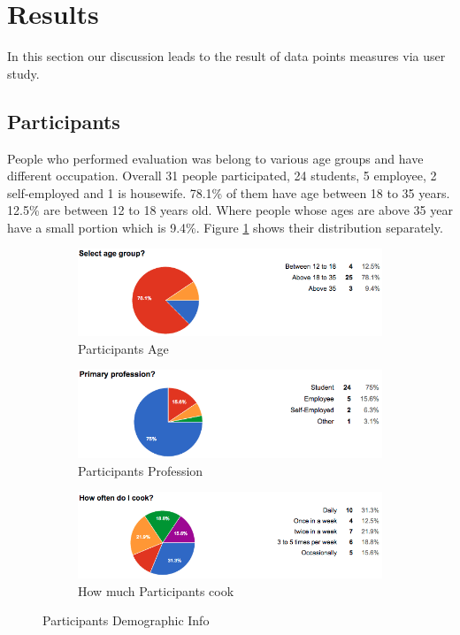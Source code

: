 \section{Results}

In this section our discussion leads to the result of data points measures via user study.  

\subsection {Participants}

People who performed evaluation was belong to various age groups and have different occupation. Overall 31 people participated, 24 students, 5 employee, 2 self-employed and 1 is housewife. 78.1\% of them have age between 18 to 35 years.  12.5\% are between 12 to 18 years old. Where people whose ages are above 35 year have a small portion which is 9.4\%. Figure \ref{fig:stat_demographic_info} shows their distribution separately. \newline

	  \begin{figure}[h]
	  	\centering
	  	\begin{subfigure}{.45\textwidth}
	  		\includegraphics[width=.9\linewidth]{figures/ch5_stat_age.png}
	  		\caption{Participants Age}
	  	\end{subfigure}
	  	\begin{subfigure}{.45\textwidth}
	  		\includegraphics[width=.9\linewidth]{figures/ch5_stat_profession.png}
	  		\caption{Participants Profession}
	  	\end{subfigure}
	  	\begin{subfigure}{.45\textwidth}
	  		\includegraphics[width=.9\linewidth]{figures/ch5_stat_cook.png}
	  		\caption{How much Participants cook}
	  	\end{subfigure}
	  	\caption{Participants Demographic Info}
	  	\label{fig:stat_demographic_info}
	  \end{figure}
	  
